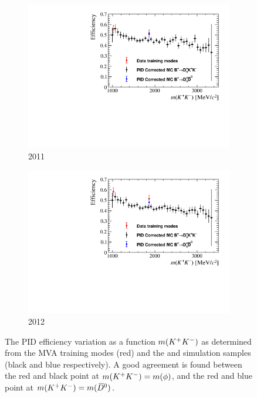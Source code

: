 \begin{figure}[!h]
   \centering
   \begin{subfigure}[t]{0.49\textwidth}
      \includegraphics[width=1.0\textwidth]{figs/B2DsKK/mKK_eff_2011_Both.pdf}
      \caption{2011}
   \end{subfigure}
   \begin{subfigure}[t]{0.49\textwidth}
      \includegraphics[width=1.0\textwidth]{figs/B2DsKK/mKK_eff_2012_Both.pdf}
      \caption{2012}
   \end{subfigure}
   \caption{The PID efficiency variation as a function $m({{K}^+}{{K}^-})$ as determined from the MVA training modes (red) and the \decay{\Bp}{\Dsp\Kp\Km} and \decay{\Bp}{\Ds\Dzb} simulation samples (black and blue respectively). A good agreement is found between the red and black point at $m({{K}^+}{{K}^-})=m(\phi)$, and the red and blue point at $m({{K}^+}{{K}^-})=m({{\kern 0.2em\overline{\kern -0.2em D}{}}{}^0})$.}
   \label{fig:B2DsKK_PID_eff_crosscheck}
\end{figure}

